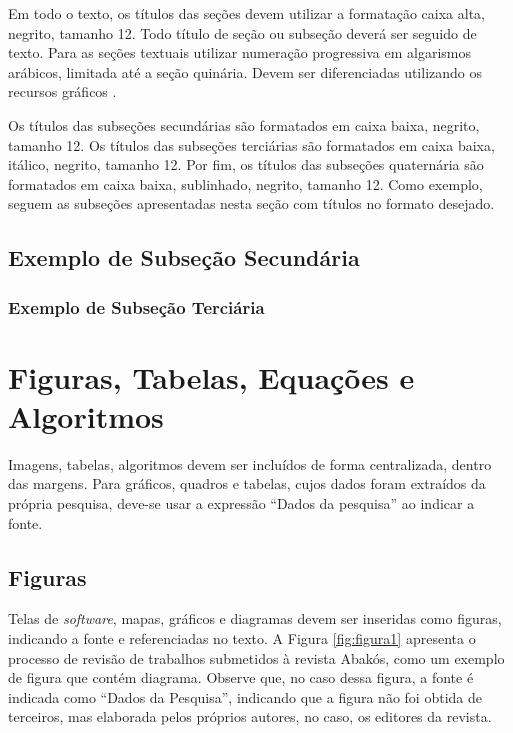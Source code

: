 \documentclass[a4paper,12pt]{article}
\begin{document}
Em todo o texto, os títulos das seções devem utilizar a formatação caixa alta, negrito, tamanho 12. Todo título de seção ou subseção deverá ser seguido de texto. Para as seções textuais utilizar numeração progressiva em algarismos arábicos, limitada até a seção quinária. Devem ser diferenciadas utilizando os recursos gráficos \cite{manualpucartigo}.

Os títulos das subseções secundárias são formatados em caixa baixa, negrito, tamanho 12. Os títulos das subseções terciárias são formatados em caixa baixa, itálico, negrito, tamanho 12. Por fim, os títulos das subseções quaternária são formatados em caixa baixa, sublinhado, negrito, tamanho 12. Como exemplo, seguem as subseções apresentadas nesta seção com títulos no formato desejado.

\subsection{Exemplo de Subseção Secundária}
\subsubsection{Exemplo de Subseção Terciária}


\section{Figuras, Tabelas, Equações e Algoritmos}
\label{sec:figTabEqAlg}

Imagens, tabelas, algoritmos devem ser incluídos de forma centralizada, dentro das margens. Para gráficos, quadros e tabelas, cujos dados foram extraídos da própria pesquisa, deve-se  usar a expressão “Dados da pesquisa” ao indicar a fonte.

\subsection{Figuras}

Telas de \textit{software}, mapas, gráficos e diagramas devem ser inseridas como figuras, indicando a fonte e referenciadas no texto. A Figura \ref{fig:figura1} apresenta o processo de revisão de trabalhos submetidos à revista Abakós, como um exemplo de figura que contém diagrama. Observe que, no caso dessa figura, a fonte é indicada como ``Dados da Pesquisa'', indicando que a figura não foi obtida de terceiros, mas elaborada pelos próprios autores, no caso, os editores da revista.
\end{document}

